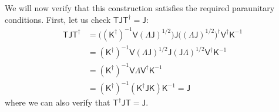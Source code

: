 We will now verify that this construction satisfies the required paraunitary conditions. First, let us check $\mathsf{TJT}^{\dagger} = \mathsf{J}$:
\begin{align*}
    \mathsf{TJT}^{\dagger} &= 
    \big( (\mathsf{K}^{\dagger})^{-1} \mathsf{V} \mathsf{(\Lambda J)}^{1/2} \big) \mathsf{J} \big( \mathsf{(\Lambda J)}^{1/2} \big)^{\dagger} \mathsf{V}^{\dagger} \mathsf{K}^{-1} \\
    &= (\mathsf{K}^{\dagger})^{-1} \mathsf{V} \mathsf{(\Lambda J)}^{1/2} \mathsf{J} \mathsf{(J\Lambda)}^{1/2} \mathsf{V}^{\dagger} \mathsf{K}^{-1} \\
    &= (\mathsf{K}^{\dagger})^{-1} \mathsf{V} \mathsf{\Lambda} \mathsf{V}^{\dagger} \mathsf{K}^{-1} \\
    &= (\mathsf{K}^{\dagger})^{-1} (\mathsf{K}^{\dagger} \mathsf{JK}) \mathsf{K}^{-1} = \mathsf{J}
\end{align*}
where we can also verify that $\mathsf{T}^{\dagger} \mathsf{JT} = \mathsf{J}$.

